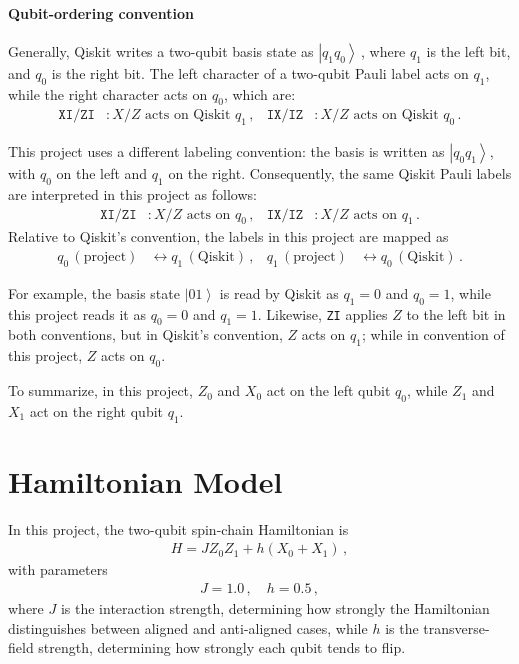 \documentclass[11pt]{article}
\numberwithin{equation}{section}
\newcommand{\ket}[1]{\left| #1 \right\rangle} %
\begin{document}
\paragraph{Qubit-ordering convention}
Generally, Qiskit writes a two-qubit basis state as $\ket{q_1q_0}$\,, where $q_1$ is the left bit, and $q_0$ is the right bit. The left character of a two-qubit Pauli label acts on $q_1$, while the right character acts on $q_0$, which are:
\begin{align*}
  \texttt{XI/ZI}&: X/Z \text{ acts on Qiskit } q_1\,, &
  \texttt{IX/IZ}&: X/Z \text{ acts on Qiskit } q_0\,.
\end{align*}

This project uses a different labeling convention: the basis is written as $\ket{q_0q_1}$, with $q_0$ on the left and $q_1$ on the right. Consequently, the same Qiskit Pauli labels are interpreted in this project as follows:
\begin{align*}
  \texttt{XI/ZI}&: X/Z \text{ acts on } q_0\,, &
  \texttt{IX/IZ}&: X/Z \text{ acts on } q_1\,.
\end{align*}
Relative to Qiskit's convention, the labels in this project are mapped as
\begin{align*}
  q_0\, (\text{project})  &\longleftrightarrow q_1\, (\text{Qiskit})\,, &
  q_1\, (\text{project})  &\longleftrightarrow q_0\, (\text{Qiskit})\,.
\end{align*}

For example, the basis state $\ket{01}$ is read by Qiskit as $q_1=0$ and $q_0=1$, while this project reads it as $q_0=0$ and $q_1=1$. Likewise, \texttt{ZI} applies $Z$ to the left bit in both conventions, but in Qiskit's convention, $Z$ acts on $q_1$; while in convention of this project, $Z$ acts on $q_0$.

To summarize, in this project, $Z_0$ and $X_0$ act on the left qubit $q_0$, while $Z_1$ and $X_1$ act on the right qubit $q_1$.



\section{Hamiltonian Model}
In this project, the two-qubit spin-chain Hamiltonian is
\begin{align}
  H = J Z_0 Z_1 + h(X_0 + X_1) \,,
\end{align}
with parameters
\begin{align*}
  J = 1.0 \,,\quad h = 0.5 \,,
\end{align*}
where $J$ is the interaction strength, determining how strongly the Hamiltonian distinguishes between aligned and anti-aligned cases, while $h$ is the transverse-field strength, determining how strongly each qubit tends to flip.
\end{document}
